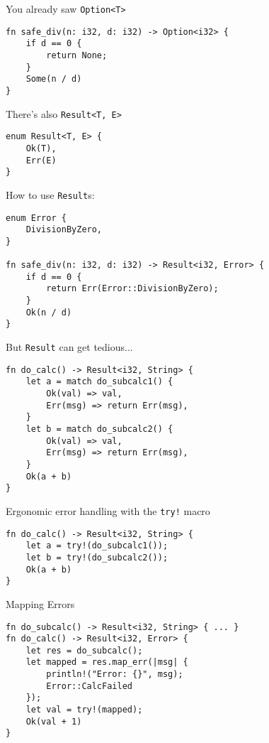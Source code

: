 \documentclass[aspectratio=1610,t]{beamer}
\begin{document}

\begin{frame}[fragile]{You already saw \texttt{Option<T>}}
\begin{verbatim}
fn safe_div(n: i32, d: i32) -> Option<i32> {
    if d == 0 {
        return None;
    }
    Some(n / d)
}
\end{verbatim}
\end{frame}


\begin{frame}[fragile]{There's also \texttt{Result<T, E>}}
\begin{verbatim}
enum Result<T, E> {
    Ok(T),
    Err(E)
}
\end{verbatim}
\end{frame}


\begin{frame}[fragile]{How to use \texttt{Result}s:}
\begin{verbatim}
enum Error {
    DivisionByZero,
}

fn safe_div(n: i32, d: i32) -> Result<i32, Error> {
    if d == 0 {
        return Err(Error::DivisionByZero);
    }
    Ok(n / d)
}
\end{verbatim}
\end{frame}


\begin{frame}[fragile]{But \texttt{Result} can get tedious...}
\begin{verbatim}
fn do_calc() -> Result<i32, String> {
    let a = match do_subcalc1() {
        Ok(val) => val,
        Err(msg) => return Err(msg),
    }
    let b = match do_subcalc2() {
        Ok(val) => val,
        Err(msg) => return Err(msg),
    }
    Ok(a + b)
}
\end{verbatim}
\end{frame}


\begin{frame}[fragile]{Ergonomic error handling with the \texttt{try!} macro}
\begin{verbatim}
fn do_calc() -> Result<i32, String> {
    let a = try!(do_subcalc1());
    let b = try!(do_subcalc2());
    Ok(a + b)
}
\end{verbatim}
\end{frame}


\begin{frame}[fragile]{Mapping Errors}
\begin{verbatim}
fn do_subcalc() -> Result<i32, String> { ... }
fn do_calc() -> Result<i32, Error> {
    let res = do_subcalc();
    let mapped = res.map_err(|msg| {
        println!("Error: {}", msg);
        Error::CalcFailed
    });
    let val = try!(mapped);
    Ok(val + 1)
}
\end{verbatim}
\end{frame}
\end{document}
